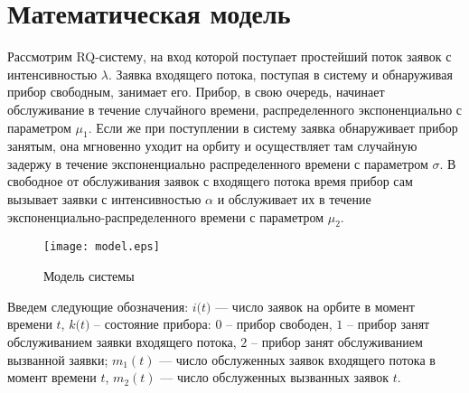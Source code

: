 \section {Математическая модель}
Рассмотрим RQ-систему, на вход которой поступает простейший поток заявок с интенсивностью $\lambda$. Заявка входящего потока, поступая в систему и обнаруживая прибор свободным, занимает его. Прибор, в свою очередь, начинает обслуживание в течение случайного времени, распределенного экспоненциально с параметром $\mu_{1}$. Если же при поступлении в систему заявка обнаруживает прибор занятым, она мгновенно уходит на орбиту и осуществляет там случайную задержу в течение экспоненциально распределенного времени с параметром $\sigma$. В свободное от обслуживания заявок с входящего потока время прибор сам вызывает заявки с интенсивностью $\alpha$ и обслуживает их в течение экспоненциально-распределенного времени с параметром $\mu_{2}$.
\begin{figure}[H]
	\centering
	\texttt{[image: model.eps]}
	\caption{Модель системы}
	\label{model_figure}
\end{figure}
Введем следующие обозначения: $\textit{i(t)}$ — число заявок на орбите в момент времени $\textit{t}$, $\textit{k(t)}$ – состояние прибора: $\textit{0}$ – прибор свободен, $\textit{1}$ – прибор занят обслуживанием заявки входящего потока, $\textit{2}$ – прибор занят обслуживанием вызванной заявки; \textit{$m_{1}(t)$} — число обслуженных заявок входящего потока в момент времени $\textit{t}$, \textit{$m_{2}(t)$} — число обслуженных вызванных заявок $\textit{t}$. 
\clearpage